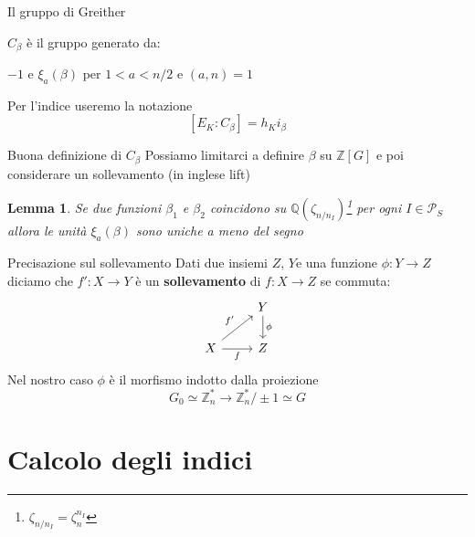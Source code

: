 \documentclass[handout]{beamer}
\theoremstyle{plain}
\newtheorem{lem}[teo]{Lemma}
\theoremstyle{remark}
\theoremstyle{definition}
\newcommand{\PS}{\mathcal{P}_S}
\newcommand{\Z}{\mathbb{Z}}
\newcommand{\Q}{\mathbb{Q}}
\begin{document}
	\begin{frame}{Il gruppo di Greither}
		\begin{alertblock}{}
		 		$C_\beta $ è il gruppo generato da:
		 		\begin{center}
		 		
		 		 $ {-1} $ e $ \xi_a (\beta) $ per $ 1< a< n/2 $ e $ (a,n)=1 $
		 		\end{center}
	 	\end{alertblock}
	 	\pause
	 	Per l'indice useremo la notazione $$ [E_K : C_\beta] = h_K i_\beta $$
	\end{frame}
	
	\begin{frame}{Buona definizione di $C_ \beta $}
		Possiamo limitarci a definire $\beta$ su $ \Z[G] $ e poi considerare un sollevamento (in inglese lift)\\
		\pause
		\begin{lem}
			Se due funzioni $ \beta_1 $ e $ \beta_2 $ coincidono su $ \Q(\zeta_{n/n_I} )$\footnote{$ \zeta_{n/n_I} = \zeta_n^{n_I} $} per ogni $ I \in \PS $ allora le unità $ \xi_a (\beta) $ sono uniche a meno del segno
		\end{lem}
	\end{frame}
	
	\begin{frame}[fragile]{Precisazione sul sollevamento}
		Dati due insiemi $ Z, \, Y $e una funzione $ \phi : Y \to Z $ diciamo che $ f' : X \to Y $ è un \textbf{sollevamento} di $ f : X \to Z $ se commuta: 
			\[\begin{tikzcd}
			 & {Y} \arrow[d, " \phi"] \\
			{X} \arrow[r, "f"'] \arrow[ru, "f'"] & {Z}               
			\end{tikzcd}\]
			\pause
			Nel nostro caso $\phi$ è il morfismo indotto dalla proiezione 
			$$G_0 \simeq  \Z_n^\ast  \to  \Z_n^\ast / \pm 1  \simeq G$$
	\end{frame}
	
\section{Calcolo degli indici}
\end{document}
